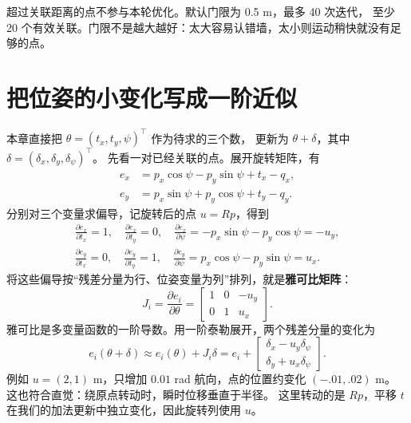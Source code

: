 超过关联距离的点不参与本轮优化。默认门限为 0.5 m，最多 40 次迭代，
至少 20 个有效关联。门限不是越大越好：太大容易认错墙，太小则运动稍快就没有足够的点。

\section{把位姿的小变化写成一阶近似}
本章直接把 $\theta=(t_x,t_y,\psi)^\top$ 作为待求的三个数，
更新为 $\theta+\delta$，其中 $\delta=(\delta_x,\delta_y,\delta_\psi)^\top$。
先看一对已经关联的点。展开旋转矩阵，有
\begin{align}
e_x&=p_x\cos\psi-p_y\sin\psi+t_x-q_x,\\
e_y&=p_x\sin\psi+p_y\cos\psi+t_y-q_y.
\end{align}
分别对三个变量求偏导，记旋转后的点 $u=Rp$，得到
\begin{align}
\frac{\partial e_x}{\partial t_x}=1,\quad
\frac{\partial e_x}{\partial t_y}=0,\quad
\frac{\partial e_x}{\partial\psi}=-p_x\sin\psi-p_y\cos\psi=-u_y,\\
\frac{\partial e_y}{\partial t_x}=0,\quad
\frac{\partial e_y}{\partial t_y}=1,\quad
\frac{\partial e_y}{\partial\psi}=p_x\cos\psi-p_y\sin\psi=u_x.
\end{align}
将这些偏导按“残差分量为行、位姿变量为列”排列，就是\textbf{雅可比矩阵}：
\begin{equation}
J_i=\frac{\partial e_i}{\partial\theta}
=\begin{bmatrix}1&0&-u_y\\0&1&u_x\end{bmatrix}.
\end{equation}
雅可比是多变量函数的一阶导数。用一阶泰勒展开，两个残差分量的变化为
\begin{equation}
e_i(\theta+\delta)\approx e_i(\theta)+J_i\delta
= e_i+\begin{bmatrix}\delta_x-u_y\delta_\psi\\
\delta_y+u_x\delta_\psi\end{bmatrix}.
\end{equation}
例如 $u=(2,1)$ m，只增加 $0.01$ rad 航向，点的位置约变化 $(-.01,.02)$ m。
这也符合直觉：绕原点转动时，瞬时位移垂直于半径。
这里转动的是 $Rp$，平移 $t$ 在我们的加法更新中独立变化，因此旋转列使用 $u$。

\par\noindent\begin{minipage}{\linewidth}

\end{minipage}\par

